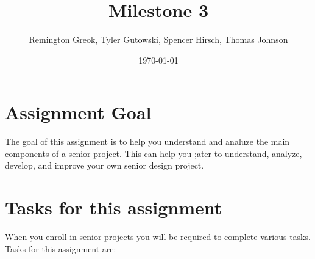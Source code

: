 \documentclass{article}
\begin{document}
\title{\textbf{Milestone 3}}
\author{Remington Greok, Tyler Gutowski, Spencer Hirsch, Thomas Johnson}
\date{\today}

\maketitle

\section*{Assignment Goal}
The goal of this assignment is to help you understand and analuze the main
components of a senior project. This can help you ;ater to understand, analyze,
develop, and improve your own senior design project.

\section*{Tasks for this assignment}
When you enroll in senior projects you will be required to complete various tasks.
Tasks for this assignment are: \\
\end{document}
